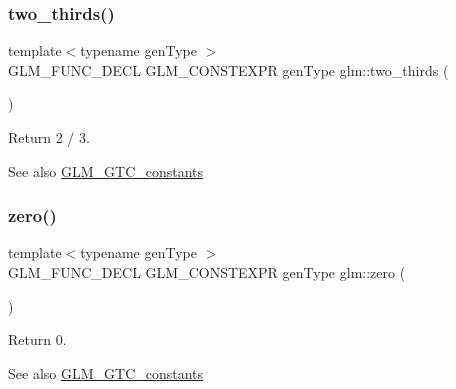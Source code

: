 \subsubsection{\texorpdfstring{two\+\_\+thirds()}{two\_thirds()}}
{\footnotesize\ttfamily template$<$typename gen\+Type $>$ \\
G\+L\+M\+\_\+\+F\+U\+N\+C\+\_\+\+D\+E\+CL G\+L\+M\+\_\+\+C\+O\+N\+S\+T\+E\+X\+PR gen\+Type glm\+::two\+\_\+thirds (\begin{DoxyParamCaption}{ }\end{DoxyParamCaption})}

Return 2 / 3. \begin{DoxySeeAlso}{See also}
\hyperlink{group__gtc__constants}{G\+L\+M\+\_\+\+G\+T\+C\+\_\+constants} 
\end{DoxySeeAlso}
\mbox{\label{group__gtc__constants_ga788f5a421fc0f40a1296ebc094cbaa8a}} 
\subsubsection{\texorpdfstring{zero()}{zero()}}
{\footnotesize\ttfamily template$<$typename gen\+Type $>$ \\
G\+L\+M\+\_\+\+F\+U\+N\+C\+\_\+\+D\+E\+CL G\+L\+M\+\_\+\+C\+O\+N\+S\+T\+E\+X\+PR gen\+Type glm\+::zero (\begin{DoxyParamCaption}{ }\end{DoxyParamCaption})}

Return 0. \begin{DoxySeeAlso}{See also}
\hyperlink{group__gtc__constants}{G\+L\+M\+\_\+\+G\+T\+C\+\_\+constants} 
\end{DoxySeeAlso}
